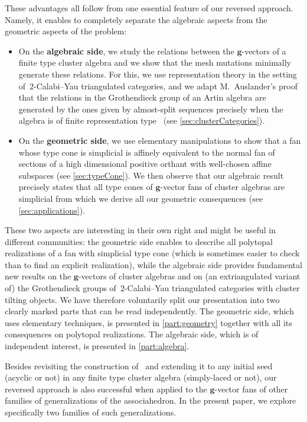 \documentclass{amsart}
\theoremstyle{definition}
\renewcommand{\b}[1]{{\boldsymbol{#1}}} %
\begin{document}
\smallskip
\noindent
These advantages all follow from one essential feature of our reversed approach.
Namely, it enables to completely separate the algebraic aspects from the geometric aspects of the problem:
\begin{itemize}
\item On the \textbf{algebraic side}, we study the relations between the $\b{g}$-vectors of a finite type cluster algebra and we show that the mesh mutations minimally generate these relations.
For this, we use representation theory in the setting of~$2$-Calabi--Yau triangulated categories, and we adapt M.~Auslander's proof that the relations in the Grothendieck group of an Artin algebra are generated by the ones given by almost-split sequences precisely when the algebra is of finite representation type~\cite{Auslander1984} (see \cref{sec:clusterCategories}).

\smallskip
\item On the \textbf{geometric side}, we use elementary manipulations to show that a fan whose type cone is simplicial is affinely equivalent to the normal fan of sections of a high dimensional positive orthant with well-chosen affine subspaces (see \cref{sec:typeCone}). We then observe that our algebraic result precisely states that all type cones of $\b{g}$-vector fans of cluster algebras are simplicial from which we derive all our geometric consequences (see \cref{sec:applications}).
\end{itemize}

\smallskip
\noindent
These two aspects are interesting in their own right and might be useful in different communities: the geometric side enables to describe all polytopal realizations of a fan with simplicial type cone (which is sometimes easier to check than to find an explicit realization), while the algebraic side provides fundamental new results on the $\b{g}$-vectors of cluster algebras and on (an extriangulated variant of) the Grothendieck groups of~$2$-Calabi--Yau triangulated categories with cluster tilting objects.
We have therefore voluntarily split our presentation into two clearly marked parts that can be read independently.
The geometric side, which uses elementary techniques, is presented in \cref{part:geometry} together with all its consequences on polytopal realizations.
The algebraic side, which is of independent interest, is presented in \cref{part:algebra}. 

\medskip
Besides revisiting the construction of~\cite{ArkaniHamedBaiHeYan, BazierMatteDouvilleMousavandThomasYildirim} and extending it to any initial seed (acyclic or not) in any finite type cluster algebra (simply-laced or not), our reversed approach is also successful when applied to the $\b{g}$-vector fans of other families of generalizations of the associahedron.
In the present paper, we explore specifically two families of such generalizations.
\end{document}
